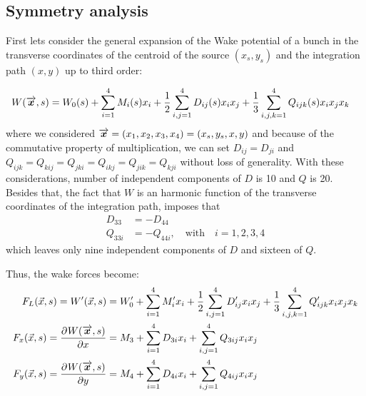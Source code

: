 \documentclass[
	12pt,				%
	openright,			%
	oneside,			%
	a4paper,		%
	chapter=TITLE,		%
	section=TITLE,		%
    brazil,				%
	english,			%
	sumario=tradicional,
	]{abntex2}
\begin{document}
\begin{apendicesenv}
\chapter{Symmetry analysis}\label{app:symmetry_analysis}

First lets consider the general expansion of the Wake potential of a bunch in the transverse coordinates of the centroid of the source $(x_s,y_s)$ and the integration path $(x,y)$ up to third order:

\begin{align}
W(\overrightarrow{\boldsymbol{x}},s) &= W_0(s) + \sum_{i=1}^4 M_i(s) x_i + \frac12\sum_{i,j=1}^4 D_{ij}(s) x_i x_j + \frac13\sum_{i,j,k=1}^4 Q_{ijk}(s) x_i x_j x_k
\end{align}
where we considered $\overrightarrow{\boldsymbol{x}} = (x_1,x_2,x_3,x_4) = (x_s,y_s,x,y)$ and because of the commutative property of multiplication, we can set $D_{ij} = D_{ji}$ and $Q_{ijk}=Q_{kij}=Q_{jki}=Q_{ikj}=Q_{jik}=Q_{kji}$ without loss of generality. With these considerations, number of independent components of $D$ is 10 and $Q$ is 20. Besides that, the fact that $W$ is an harmonic function of the transverse coordinates of the integration path, imposes that
\begin{align}
D_{33} &= - D_{44} \\
Q_{33i} &= - Q_{44i}, \quad \text{with} \quad i=1,2,3,4
\end{align}
which leaves only nine independent components of $D$ and sixteen of $Q$.

Thus, the wake forces become:
\begin{align}
F_L(\vec{x},s) = W'(\vec{x},s) &= W_0' + \sum_{i=1}^4 M_i' x_i + \frac12\sum_{i,j=1}^4 D_{ij}' x_i x_j + \frac13\sum_{i,j,k=1}^4 Q_{ijk}' x_i x_j x_k \\
F_x(\vec{x},s) = \frac{\partial^{{}}W(\overrightarrow{\boldsymbol{x}},s)}{\partial x^{{}}} &= M_3 + \sum_{i=1}^4 D_{3i} x_i + \sum_{i,j=1}^4 Q_{3ij} x_i x_j \\
F_y(\vec{x},s) = \frac{\partial^{{}}W(\overrightarrow{\boldsymbol{x}},s)}{\partial y^{{}}} &= M_4 + \sum_{i=1}^4 D_{4i} x_i + \sum_{i,j=1}^4 Q_{4ij} x_i x_j
\end{align}


\end{apendicesenv}
\end{document}
